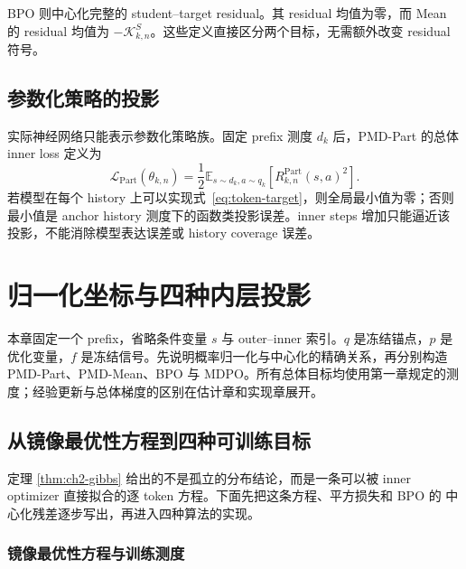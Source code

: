 \documentclass[lang=cn,scheme=chinese,openany]{../book/elegantbook}
\newcommand{\E}{\mathbb E}
\begin{document}
BPO 则中心化完整的 student--target residual。其 residual 均值为零，而 Mean 的 residual 均值为 $-\mathcal K_{k,n}^S$。这些定义直接区分两个目标，无需额外改变 residual 符号。

\section{参数化策略的投影}

实际神经网络只能表示参数化策略族。固定 prefix 测度 $d_k$ 后，PMD-Part 的总体 inner loss 定义为
\begin{equation}\label{eq:part-loss}
 \mathcal L_{\mathrm{Part}}(\theta_{k,n})
 =\frac12\E_{s\sim d_k,a\sim q_k}
 \left[R^{\mathrm{Part}}_{k,n}(s,a)^2\right].
\end{equation}
若模型在每个 history 上可以实现式~\eqref{eq:token-target}，则全局最小值为零；否则最小值是 anchor history 测度下的函数类投影误差。inner steps 增加只能逼近该投影，不能消除模型表达误差或 history coverage 误差。





\chapter{归一化坐标与四种内层投影}
\label{ch:four-methods}
本章固定一个 prefix，省略条件变量 $s$ 与 outer--inner 索引。$q$ 是冻结锚点，$p$ 是优化变量，$f$ 是冻结信号。先说明概率归一化与中心化的精确关系，再分别构造 PMD-Part、PMD-Mean、BPO 与 MDPO。所有总体目标均使用第一章规定的测度；经验更新与总体梯度的区别在估计章和实现章展开。

\section{从镜像最优性方程到四种可训练目标}
\label{sec:ch2-objective-derivation}

定理 \ref{thm:ch2-gibbs} 给出的不是孤立的分布结论，而是一条可以被 inner
optimizer 直接拟合的逐 token 方程。下面先把这条方程、平方损失和 BPO 的
中心化残差逐步写出，再进入四种算法的实现。

\subsection{镜像最优性方程与训练测度}
\label{subsec:ch2-optimality-bridge}
\end{document}
